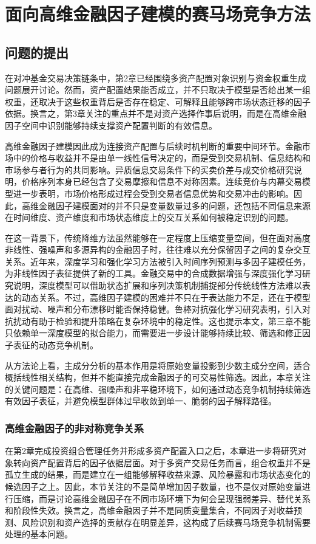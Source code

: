 \chapter{面向高维金融因子建模的赛马场竞争方法}

\section{问题的提出}
在对冲基金交易决策链条中，第2章已经围绕多资产配置对象识别与资金权重生成问题展开讨论。然而，资产配置结果能否成立，并不只取决于模型是否给出某一组权重，还取决于这些权重背后是否存在稳定、可解释且能够跨市场状态迁移的因子依据。换言之，第3章关注的重点并不是对资产选择作事后说明，而是在高维金融因子空间中识别能够持续支撑资产配置判断的有效信息。

高维金融因子建模因此成为连接资产配置与后续时机判断的重要中间环节。金融市场中的价格与收益并不是由单一线性信号决定的，而是受到交易机制、信息结构和市场参与者行为的共同影响。异质信息交易条件下的买卖价差与成交价格研究说明，价格序列本身已经包含了交易摩擦和信息不对称因素\cite{glosten1985bid}。连续竞价与内幕交易模型进一步表明，市场价格形成过程会受到交易者信息优势和交易冲击的影响\cite{kyle1985continuous}。因此，高维金融因子建模面对的并不只是变量数量过多的问题，还包括不同信息来源在时间维度、资产维度和市场状态维度上的交互关系如何被稳定识别的问题。

在这一背景下，传统降维方法虽然能够在一定程度上压缩变量空间，但在面对高度非线性、强噪声和多源异构的金融因子时，往往难以充分保留因子之间的复杂交互关系。近年来，深度学习和强化学习方法被引入时间序列预测与多因子建模任务，为非线性因子表征提供了新的工具。金融交易中的合成数据增强与深度强化学习研究说明，深度模型可以借助状态扩展和序列决策机制捕捉部分传统线性方法难以表达的动态关系\cite{liu2022synthetic}。不过，高维因子建模的困难并不只在于表达能力不足，还在于模型面对扰动、噪声和分布漂移时能否保持稳健。鲁棒对抗强化学习研究表明，引入对抗扰动有助于检验和提升策略在复杂环境中的稳定性\cite{pinto2017robust}。这也提示本文，第三章不能只依赖单一深度模型的拟合能力，而需要进一步设计能够持续比较、筛选和修正因子表征的动态竞争机制。

从方法论上看，主成分分析的基本作用是将原始变量投影到少数主成分空间，适合概括线性相关结构，但并不能直接完成金融因子的可交易性筛选\cite{abdi2010principal}。因此，本章关注的关键问题是：在高维、强噪声和非平稳环境下，如何通过动态竞争机制持续筛选有效因子表征，并避免模型群体过早收敛到单一、脆弱的因子解释路径。


\subsection{高维金融因子的非对称竞争关系}
在第2章完成投资组合管理任务并形成多资产配置入口之后，本章进一步将研究对象转向资产配置背后的因子依据层面。对于多资产交易任务而言，组合权重并不是孤立生成的结果，而是建立在一组能够解释收益来源、风险暴露和市场状态变化的候选因子之上。因此，本节关注的不是简单增加因子数量，也不是仅对原始变量进行压缩，而是讨论高维金融因子在不同市场环境下为何会呈现强弱差异、替代关系和阶段性失效。换言之，高维金融因子并不是同质变量集合，不同因子对收益预测、风险识别和资产选择的贡献存在明显差异，这构成了后续赛马场竞争机制需要处理的基本问题。

